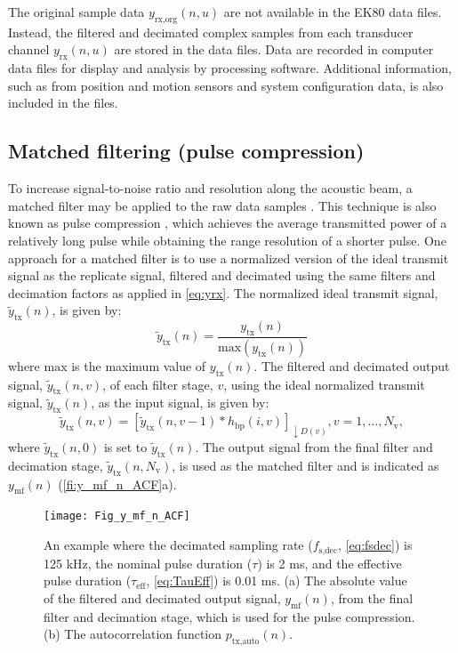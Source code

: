 \documentclass[preprint,12pt,TurnOnLineNumbers]{JASAnew}
\newcommand{\samplesymt}{n}
\newcommand{\genidxsym}{i}
\newcommand{\channelsym}{u}
\newcommand{\stagesym}{v}
\newcommand{\nstages}{N_{\textrm{v}}}
\newcommand{\fsdec}{f_{\textrm{s,dec}}}
\newcommand{\tnom}{\tau}
\newcommand{\teff}{\tau_{\textrm{eff}}}
\newcommand{\ytx}{y_{\textrm{tx}}}
\newcommand{\ytxnorm}{\tilde{y}_{\textrm{tx}}}
\newcommand{\yrx}{y_{\textrm{rx}}}
\newcommand{\yrxorg}{y_{\textrm{rx,org}}}
\newcommand{\ymf}{y_{\textrm{mf}}}
\newcommand{\ptxauto}{p_{\textrm{tx,auto}}}
\newcommand{\decfac}{D}
\newcommand{\hbp}{h_{\textrm{bp}}}
\begin{document}
The original sample data $\yrxorg(\samplesymt,\channelsym)$ are not available in the EK80 data files. Instead, the filtered and decimated complex samples from each transducer channel $\yrx(\samplesymt,\channelsym)$ are stored in the data files. Data are recorded in computer data files for display and analysis by processing software. Additional information, such as from position and motion sensors and system configuration data, is also included in the files.

\subsection{Matched filtering (pulse compression)}
To increase signal-to-noise ratio and resolution along the acoustic beam, a matched filter may be applied to the raw data samples \citep{turin1960}. This technique is also known as pulse compression \citep{klauder1960}, which achieves the average transmitted power of a relatively long pulse while obtaining the range resolution of a shorter pulse. One approach for a matched filter is to use a normalized version of the ideal transmit signal as the replicate signal, filtered and decimated using the same filters and decimation factors as applied in \autoref{eq:yrx}. The normalized ideal transmit signal, $\ytxnorm(\samplesymt)$, is given by:
%
\begin{equation}
\label{eq:ytxnorm}
\ytxnorm(\samplesymt) = \frac{\ytx(\samplesymt)}{\textrm{max}(\ytx(\samplesymt))}\end{equation}
%
where $\textrm{max}$ is the maximum value of $\ytx(\samplesymt)$. The filtered and decimated output signal, $\ytxnorm(\samplesymt,\stagesym)$, of each filter stage, $\stagesym$, using the ideal normalized transmit signal, $\ytxnorm(\samplesymt)$, as the input signal, is given by:
%
\begin{equation}
\label{eq:FilterStagesTX}
\ytxnorm(\samplesymt,\stagesym) = \left[ \ytxnorm(\samplesymt,\stagesym-1) * \hbp(\genidxsym,\stagesym) \right]_{\downarrow \decfac(\stagesym)}, 
\stagesym = 1,\ldots,\nstages,
\end{equation}
%
where $\ytxnorm(\samplesymt,0)$ is set to $\ytxnorm(\samplesymt)$. The output signal from the final filter and decimation stage, $\ytxnorm(\samplesymt,\nstages)$, is used as the matched filter and is indicated as $\ymf(\samplesymt)$  (\autoref{fi:y_mf_n_ACF}a).
%
\begin{figure}
\texttt{[image: Fig\_y\_mf\_n\_ACF]}
\caption{\label{fi:y_mf_n_ACF} An example where the decimated sampling rate ($\fsdec$, \autoref{eq:fsdec}) is 125 kHz, the nominal pulse duration ($\tnom$) is 2 ms, and the effective pulse duration ($\teff$, \autoref{eq:TauEff}) is 0.01 ms. (a) The absolute value of the filtered and decimated output signal, $\ymf(\samplesymt)$, from the final filter and decimation stage, which is used for the pulse compression. (b) The autocorrelation function $\ptxauto(n)$.}
\end{figure}
\end{document}
